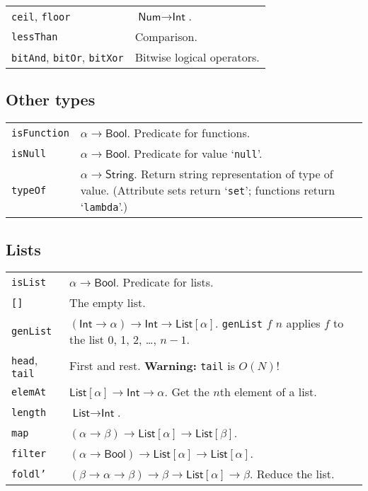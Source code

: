 \documentclass[9pt, a4paper, landscape]{extarticle}
\newcommand{\cmd}[1]{\texttt{#1}}
\newcommand{\str}{\textsf{String}}
\newcommand{\itg}{\textsf{Int}} %
\newcommand{\num}{\textsf{Num}} %
\newcommand{\lst}{\textsf{List}}
\newcommand{\bln}{\textsf{Bool}}
\begin{document}
\begin{multicols*}{3}
\begin{tabularx}{\columnwidth}{@{}l>{\raggedright\arraybackslash}X@{}}
  \cmd{ceil}, \cmd{floor} & $\num\to\itg$. \\

  \cmd{lessThan} & Comparison. \\

  \cmd{bitAnd}, \cmd{bitOr}, \cmd{bitXor} & Bitwise logical
  operators. \\
\end{tabularx}

\subsection*{Other types}

\begin{tabularx}{\columnwidth}{@{}l>{\raggedright\arraybackslash}X@{}}
  \cmd{isFunction} & $\alpha\to\bln$. Predicate for functions. \\

  \cmd{isNull} & $\alpha\to\bln$. Predicate for value `\cmd{null}'. \\

  \cmd{typeOf} & $\alpha\to\str$. Return string representation of type of
  value. (Attribute sets return `\cmd{set}'; functions return
  `\cmd{lambda}'.) \\
  
\end{tabularx}


\subsection*{Lists}
\begin{tabularx}{\columnwidth}{@{}l>{\raggedright\arraybackslash}X@{}}
  \cmd{isList}      & $\alpha\to\bln$. Predicate for lists. \\
  \cmd{[]}          & The empty list. \\
  \cmd{genList}     & $(\itg\to\alpha)\to\itg\to\lst[\alpha]$.\newline
  \cmd{genList} $f$ $n$ applies $f$ to the list 0, 1, 2, \dots, $n-1$. \\

  \cmd{head}, \cmd{tail} & First and rest. \textbf{Warning:} \cmd{tail}
  is $O(N)$! \\
  \cmd{elemAt}      & $\lst[\alpha] \to \itg \to \alpha$. Get the $n$th element of a list. \\
  \cmd{length}      & $\lst \to \itg$. \\
  
  \cmd{map}         & $(\alpha\to\beta)\to\lst[\alpha]\to\lst[\beta]$. \\
  \cmd{filter}      & $(\alpha\to\bln)\to\lst[\alpha]\to\lst[\alpha]$. \\
  \cmd{foldl'}      & $(\beta\to\alpha\to\beta)\to\beta\to\lst[\alpha]\to\beta$. Reduce the list.\\
  

\end{tabularx}
\end{multicols*}
\end{document}
